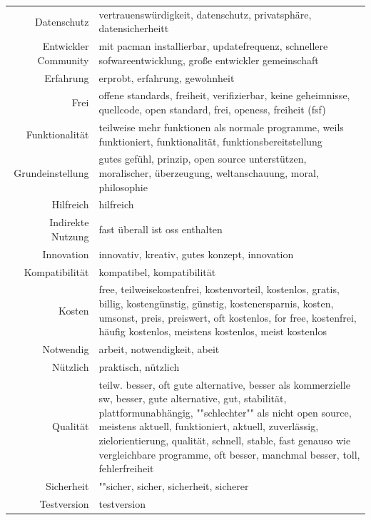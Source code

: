 \documentclass[a4paper]{article}
\begin{document}
\begin{table}[!htbp]
\begin{tabularx}{\textwidth}{rX}
                    Datenschutz & \tiny vertrauenswürdigkeit, datenschutz, privatsphäre, datensicherheitt\\
                    Entwickler Community & \tiny mit pacman installierbar, updatefrequenz, schnellere sofwareentwicklung, große entwickler gemeinschaft\\
                    Erfahrung & \tiny erprobt, erfahrung, gewohnheit\\
                    Frei & \tiny offene standards, freiheit, verifizierbar, keine geheimnisse, quellcode, open standard, frei, openess, freiheit (fsf)\\
                    Funktionalität & \tiny teilweise mehr funktionen als normale programme, weils funktioniert, funktionalität, funktionsbereitstellung\\
                    Grundeinstellung & \tiny gutes gefühl, prinzip, open source unterstützen, moralischer, überzeugung, weltanschauung, moral, philosophie\\
                    Hilfreich & \tiny hilfreich\\
                    Indirekte Nutzung & \tiny fast überall ist oss enthalten\\
                    Innovation & \tiny innovativ, kreativ, gutes konzept, innovation\\
                    Kompatibilität & \tiny kompatibel, kompatibilität\\
                    Kosten & \tiny free, teilweisekostenfrei, kostenvorteil, kostenlos, gratis, billig, kostengünstig, günstig, kostenersparnis, kosten, umsonst, preis, preiswert, oft kostenlos, for free, kostenfrei, häufig kostenlos, meistens kostenlos, meist kostenlos\\
                    Notwendig & \tiny arbeit, notwendigkeit, abeit\\
                    Nützlich & \tiny praktisch, nützlich\\
                    Qualität & \tiny teilw. besser, oft gute alternative, besser als kommerzielle sw, besser, gute alternative, gut, stabilität, plattformunabhängig, ""schlechter"" als nicht open source, meistens aktuell, funktioniert, aktuell, zuverlässig, zielorientierung, qualität, schnell, stable, fast genauso wie vergleichbare programme, oft besser, manchmal besser, toll, fehlerfreiheit\\
                    Sicherheit & \tiny ""sicher, sicher, sicherheit, sicherer\\
                    Testversion & \tiny testversion\\

\end{tabularx}
\end{table}
\end{document}
